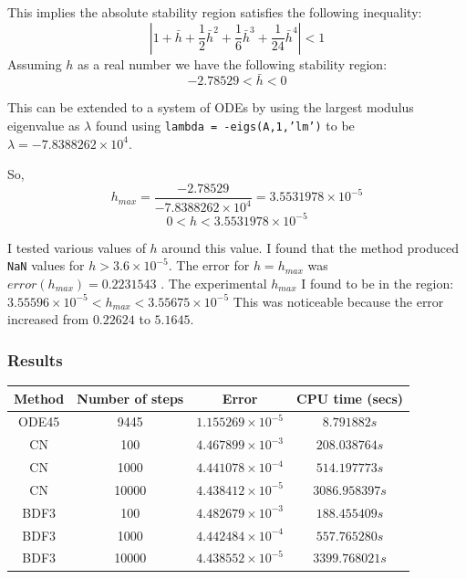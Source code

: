 \documentclass[a4paper, 11pt]{article}
\begin{document}
				This implies the absolute stability region satisfies the following inequality:
				\begin{equation}
					|1 + \bar{h} + \frac{1}{2}\bar{h}^2 + \frac{1}{6}\bar{h}^3 + \frac{1}{24}\bar{h}^4| < 1 
				\end{equation}
				Assuming $h$ as a real number we have the following stability region:
				\begin{equation}
					-2.78529 < \bar{h} < 0
				\end{equation}
				
				This can be extended to a system of ODEs by using the largest modulus eigenvalue as $ \lambda $ found using \texttt{lambda = -eigs(A,1,’lm’)} to be $ \lambda = -7.8388262\times 10^{4} $.		
				
				So, 
				\begin{equation}
					h_{max} = \frac{-2.78529}{-7.8388262\times 10^{4}} = 3.5531978\times 10^{-5} 
				\end{equation}
				\begin{equation}
					0 < h < 3.5531978\times 10^{-5} 
				\end{equation}
			 
				
				I tested various values of $h$ around this value. 
				I found that the method produced \texttt{NaN} values for $h > 3.6\times 10^{-5} $.
				The error for $ h = h_{max}$ was $error(h_{max}) = 0.2231543$ .
				The experimental $h_{max}$ I found to be in the region: $ 3.55596 \times 10^{-5} < h_{max} < 3.55675 \times 10^{-5}$
				This was noticeable because the error increased from $ 0.22624 $ to $ 5.1645 $.
				
				
		\subsubsection*{Results}
			\begin{table}[H]
				\centering
				\begin{tabular}{c|c|c|c}
					\textbf{Method} & \textbf{Number of steps} 	& \textbf{Error}  				& \textbf{CPU time (secs)}  	\\ \hline
					ODE45 			& 9445 						& $ 1.155269\times 10^{-5} $ 	& $ 8.791882 s $ 	\\ \hline 
					CN 				& 100 						& $ 4.467899\times 10^{-3} $ 	& $ 208.038764 s $ 				\\ \hline
					CN 				& 1000 						& $ 4.441078\times 10^{-4} $ 	& $ 514.197773 s $ 				\\ \hline
					CN 				& 10000 					& $ 4.438412\times 10^{-5} $ 	& $ 3086.958397 s $				\\ \hline
					BDF3 			& 100				 		& $ 4.482679\times 10^{-3} $ 	& $ 188.455409 s $ 				\\ \hline
					BDF3 			& 1000						& $ 4.442484\times 10^{-4} $ 	& $ 557.765280 s $ 				\\ \hline
					BDF3 			& 10000 					& $ 4.438552\times 10^{-5} $ 	& $ 3399.768021 s $ 			\\ \hline
				\end{tabular}
			\end{table}
	
\end{document}
